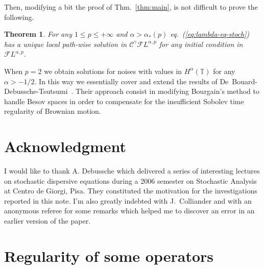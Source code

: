 \documentclass[a4paper,11pt,reqno]{article}
\newcommand{\TT}{\mathbb{T}}
\newcommand{\CC}{\mathcal{C}}
\newcommand{\FF}{\mathcal{F}}
\newtheorem{theorem}{Theorem}
\begin{document}
Then, modifying a bit the proof of Thm.~\ref{thm:main}, is not
difficult to prove the following.

\begin{theorem}
\label{th:eq-stoch} For any $1 \le p \le +\infty$ and $\alpha > \alpha_*(p)$
eq.~(\ref{eq:lambda-eq-stoch}) has a unique local path-wise solution in $\CC^\gamma \FF L^{\alpha,p}$ for any initial
condition in $\FF L^{\alpha,p}$.  
\end{theorem}
%
When $p=2$  we obtain
solutions for noises with values in $H^\alpha(\TT)$ for any  $\alpha > -1/2$.
In this way we essentially cover and extend the results of
De~Bouard-Debussche-Tsutsumi~\cite{MR2111917}. Their approach consist
in modifying Bourgain's method to handle  Besov spaces in order to compensate
for the insufficient  Sobolev time regularity of Brownian motion.

\section*{Acknowledgment}
I would like to thank A. Debussche which  delivered a series of interesting
lectures on stochastic dispersive equations  during a 2006
semester on Stochastic Analysis at Centro de Giorgi, Pisa. They
constituted the motivation for the investigations reported in this
note. I'm also greatly indebted with J.~Colliander and with an anonymous referee for  some remarks which helped me to discover an error in an earlier version of the paper. 


\appendix
\section{Regularity of some operators}
\label{sec:reg}
\end{document}
